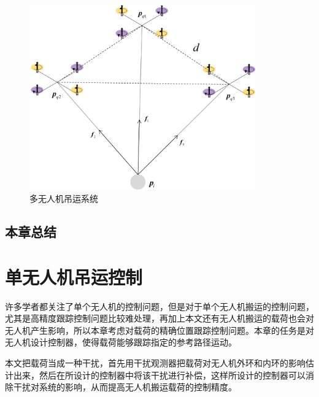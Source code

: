 \documentclass[lang=chs, degree=master, blindreview=false, winfonts=true]{yanputhesis}
\begin{document}
\begin{figure}[hbt!]
	\centering
	\includegraphics[width=23pc]{picture/2_3.png} 
	\caption{多无人机吊运系统} \label{2_3}
\end{figure}

\section{本章总结}

\cleardoublepage

\chapter{单无人机吊运控制}

许多学者都关注了单个无人机的控制问题，但是对于单个无人机搬运的控制问题，尤其是高精度跟踪控制问题比较难处理，再加上本文还有无人机搬运的载荷也会对无人机产生影响，所以本章考虑对载荷的精确位置跟踪控制问题。本章的任务是对无人机设计控制器，使得载荷能够跟踪指定的参考路径运动。 

本文把载荷当成一种干扰，首先用干扰观测器把载荷对无人机外环和内环的影响估计出来，然后在所设计的控制器中将该干扰进行补偿，这样所设计的控制器可以消除干扰对系统的影响，从而提高无人机搬运载荷的控制精度。
\end{document}
